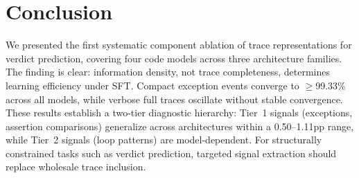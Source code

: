 \section{Conclusion}

We presented the first systematic component ablation of trace representations for verdict prediction, covering four code models across three architecture families.
The finding is clear: information density, not trace completeness, determines learning efficiency under SFT.
Compact exception events converge to ${\geq}$99.33\% across all models, while verbose full traces oscillate without stable convergence.
These results establish a two-tier diagnostic hierarchy: Tier~1 signals (exceptions, assertion comparisons) generalize across architectures within a 0.50--1.11pp range, while Tier~2 signals (loop patterns) are model-dependent. For structurally constrained tasks such as verdict prediction, targeted signal extraction should replace wholesale trace inclusion.

